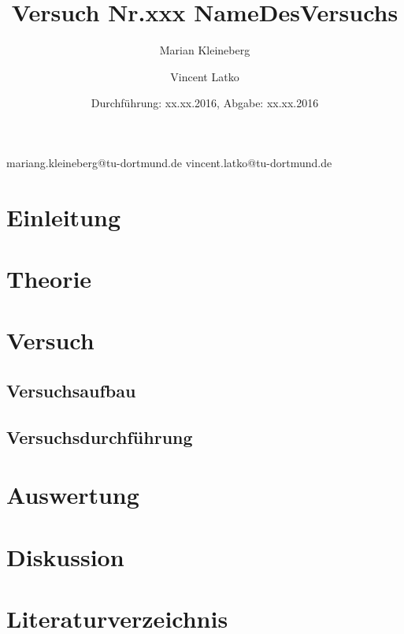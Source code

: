 \documentclass[paper=a4]{scrartcl}
\title{Versuch Nr.xxx \quad\quad\quad\quad\quad\quad\quad\quad\quad\quad\quad\quad NameDesVersuchs}
\author{Marian Kleineberg\and Vincent Latko}
\date{Durchführung: xx.xx.2016, Abgabe: xx.xx.2016}
\begin{document}
\maketitle
\thispagestyle{empty}
\vfill
mariang.kleineberg@tu-dortmund.de \qquad\qquad\qquad\qquad\qquad\qquad vincent.latko@tu-dortmund.de
\newpage
\tableofcontents
\newpage

\section{Einleitung}
\section{Theorie}
\section{Versuch}
\subsection{Versuchsaufbau}
\subsection{Versuchsdurchführung}
\section{Auswertung}
\section{Diskussion}
\section{Literaturverzeichnis}
\end{document}
